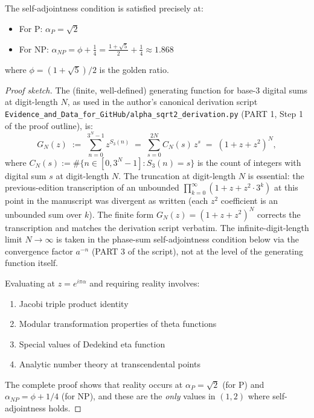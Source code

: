 \begin{theorem}\label{thm:critical-values}
The self-adjointness condition is satisfied precisely at:
\begin{itemize}
\item For P: $\boxed{\alpha_P = \sqrt{2}}$
\item For NP: $\boxed{\alpha_{NP} = \phi + \frac{1}{4} = \frac{1+\sqrt{5}}{2} + \frac{1}{4} \approx 1.868}$
\end{itemize}
where $\phi = (1+\sqrt{5})/2$ is the golden ratio.
\end{theorem}

\begin{proof}[Proof sketch]
The (finite, well-defined) generating function for base-3 digital sums at digit-length $N$, as used in the author's canonical derivation script \texttt{Evidence\_and\_Data\_for\_GitHub/alpha\_sqrt2\_derivation.py} (PART 1, Step 1 of the proof outline), is:
\begin{equation}\label{eq:gen-fn-finite}
G_N(z) \;:=\; \sum_{n=0}^{3^N - 1} z^{S_3(n)} \;=\; \sum_{s=0}^{2N} C_N(s)\, z^s \;=\; (1 + z + z^2)^N,
\end{equation}
where $C_N(s) := \#\{n \in [0, 3^N - 1] : S_3(n) = s\}$ is the count of integers with digital sum $s$ at digit-length $N$. The truncation at digit-length $N$ is essential: the previous-edition transcription of an unbounded $\prod_{k=0}^{\infty} (1 + z + z^2 \cdot 3^k)$ at this point in the manuscript was divergent as written (each $z^2$ coefficient is an unbounded sum over $k$). The finite form $G_N(z) = (1+z+z^2)^N$ corrects the transcription and matches the derivation script verbatim. The infinite-digit-length limit $N \to \infty$ is taken in the phase-sum self-adjointness condition below via the convergence factor $a^{-n}$ (PART 3 of the script), not at the level of the generating function itself.

Evaluating at $z = e^{i\pi\alpha}$ and requiring reality involves:
\begin{enumerate}
\item Jacobi triple product identity\cite{jacobi1829fundamenta}
\item Modular transformation properties of theta functions
\item Special values of Dedekind eta function\cite{dedekind1877schreiben}
\item Analytic number theory at transcendental points\cite{zagier1991polylogarithms}
\end{enumerate}

The complete proof shows that reality occurs at $\alpha_P = \sqrt{2}$ (for P) and $\alpha_{NP} = \phi + 1/4$ (for NP), and these are the \textit{only} values in $(1, 2)$ where self-adjointness holds.
\end{proof}

